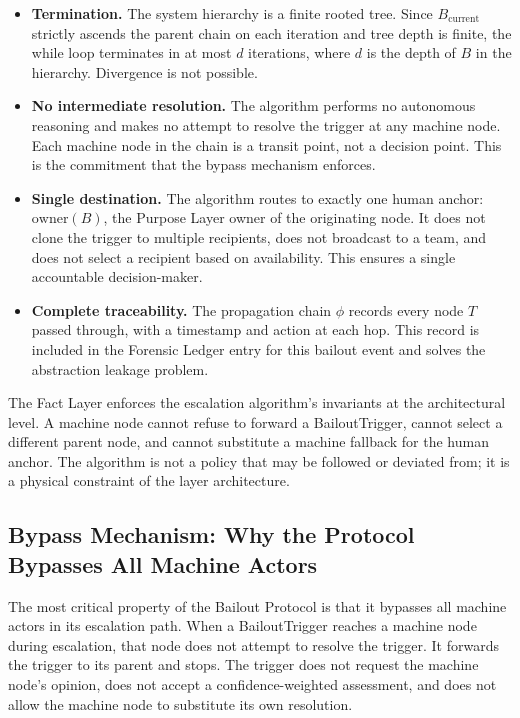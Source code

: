 \begin{itemize}\setlength\itemsep{0.25em}
\item \textbf{Termination.} The system hierarchy is a finite rooted tree. Since $B_{\text{current}}$ strictly ascends the parent chain on each iteration and tree depth is finite, the while loop terminates in at most $d$ iterations, where $d$ is the depth of $B$ in the hierarchy. Divergence is not possible.

\item \textbf{No intermediate resolution.} The algorithm performs no autonomous reasoning and makes no attempt to resolve the trigger at any machine node. Each machine node in the chain is a transit point, not a decision point. This is the commitment that the bypass mechanism enforces.

\item \textbf{Single destination.} The algorithm routes to exactly one human anchor: $\text{owner}(B)$, the Purpose Layer owner of the originating node. It does not clone the trigger to multiple recipients, does not broadcast to a team, and does not select a recipient based on availability. This ensures a single accountable decision-maker.

\item \textbf{Complete traceability.} The propagation chain $\phi$ records every node $T$ passed through, with a timestamp and action at each hop. This record is included in the Forensic Ledger entry for this bailout event and solves the abstraction leakage problem.
\end{itemize}

The Fact Layer enforces the escalation algorithm's invariants at the architectural level. A machine node cannot refuse to forward a BailoutTrigger, cannot select a different parent node, and cannot substitute a machine fallback for the human anchor. The algorithm is not a policy that may be followed or deviated from; it is a physical constraint of the layer architecture.

\subsection{Bypass Mechanism: Why the Protocol Bypasses All Machine Actors}
\label{sec:bailout-bypass}

The most critical property of the Bailout Protocol is that it bypasses all machine actors in its escalation path. When a BailoutTrigger reaches a machine node during escalation, that node does not attempt to resolve the trigger. It forwards the trigger to its parent and stops. The trigger does not request the machine node's opinion, does not accept a confidence-weighted assessment, and does not allow the machine node to substitute its own resolution.

